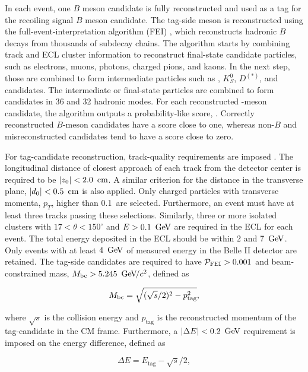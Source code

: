 In each event, one $B$ meson candidate is fully reconstructed and used as a tag for the recoiling signal $B$ meson candidate. The tag-side \B meson is reconstructed using the full-event-interpretation algorithm (FEI) \cite{FEI}, which reconstructs hadronic $B$ decays from thousands of subdecay chains. The algorithm starts by combining track and ECL cluster information to reconstruct final-state candidate particles, such as electrons, muons, photons, charged pions, and kaons. In the next step, those are combined to form intermediate particles
such as \piz, $K_S^0$, $D^{(*)}$, and \jpsi candidates. The intermediate or final-state particles are combined to form \B candidates in 36 \Bp and 32 \Bz hadronic modes. For each reconstructed \B-meson candidate, the algorithm outputs a probability-like score, \feiProb. Correctly reconstructed $B$-meson candidates have a score close to one, whereas non-$B$ and misreconstructed candidates tend to have a score close to zero.

For tag-candidate reconstruction, track-quality requirements are imposed \cite{BERTACCHI2021107610}. The longitudinal distance of closest approach of each track from the detector center is required to be $|z_0|<2.0~{\rm \,cm}$. A similar criterion for the distance in the transverse plane, $|d_0|<0.5~{\rm \,cm}$ is also applied. Only charged particles with transverse momenta, $p_T$, higher than 0.1~\gevc are selected. Furthermore, an event must have at least three tracks passing these selections. Similarly, three or more isolated clusters with $17<\theta<150^{\circ}$ and $E>0.1~\mathrm{\,Ge\kern -0.1em V}$ are required in the ECL for each event. The total energy deposited in the ECL should be within $2$ and $7~\mathrm{\,Ge\kern -0.1em V}$. Only events with at least $4~\mathrm{\,Ge\kern -0.1em V}$ of measured energy in the Belle II detector are retained. The tag-side \B candidates are required to have $\mathcal{P}_{\mathrm{FEI}}>0.001$ and beam-constrained mass, ${M_{\mathrm{bc}}}>5.245~{\mathrm{\,Ge\kern -0.1em V\!/}c^2}$, defined as

\begin{equation}\label{eq:mbc}
{\ensuremath{M_{\mathrm{bc}}}} = \sqrt{(\sqrt{s}/2)^2 - p_{\mathrm{tag}}^2},
\end{equation}

\noindent where $\sqrt{s}$ is the collision energy and $p_{\mathrm{tag}}$ is the reconstructed momentum of the tag-candidate in the CM frame. Furthermore, a $|\Delta E|<0.2~\mathrm{\,Ge\kern -0.1em V}$ requirement is imposed on the energy difference, defined as 

\begin{equation}
    \Delta E = E_{\mathrm{tag}} - \sqrt{s}/2,
\end{equation}

